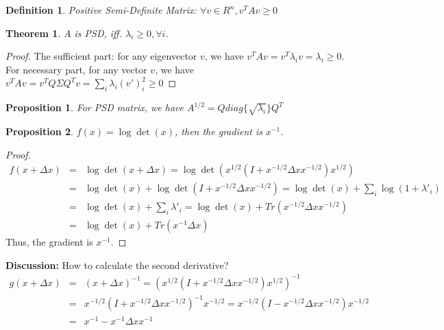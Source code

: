 \documentclass[12pt]{article}
\newtheorem{theorem}{Theorem}[section]
\newtheorem{definition}{Definition}[section]
\newtheorem{proposition}{Proposition}[section]
\begin{document}
\begin{definition}
	Positive Semi-Definite Matrix: $\forall v\in R^n, v^TAv\ge0$
\end{definition}
\begin{theorem}
	$A$ is PSD, iff. $\lambda_i\ge0, \forall i$.
\end{theorem} 
\begin{proof}
	The sufficient part: for any eigenvector $v$, we have $v^TAv=v^T\lambda_i v=\lambda_i\ge0$. For necessary part, for any vector $v$, we have $v^TAv=v^TQ\Sigma Q^Tv=\sum_i \lambda_i(v')_i^2\ge0$
\end{proof}
\begin{proposition}
	For PSD matrix, we have $A^{1/2}=Qdiag\{\sqrt{\lambda_i}\}Q^T$
\end{proposition}
\begin{proposition}
	$f(x) = \log\det(x)$, then the gradient is $x^{-1}$.
\end{proposition}
\begin{proof}
\begin{eqnarray}
f(x+\Delta x) &=& \log \det (x+\Delta x)=\log\det(x^{1/2}(I+x^{-1/2}\Delta xx^{-1/2})x^{1/2})\\
&=&\log \det(x) + \log\det(I+x^{-1/2}\Delta xx^{-1/2})=\log \det(x) +\sum_i \log(1+\lambda'_i)\\
&=&\log \det(x) +\sum_i \lambda'_i = \log \det(x) + Tr(x^{-1/2}\Delta xx^{-1/2}) \\
&=&\log \det(x) + Tr(x^{-1}\Delta x) 
\end{eqnarray}
Thus, the gradient is $x^{-1}$.
\end{proof}
{\bf Discussion: }How to calculate the second derivative? 
\begin{eqnarray}
	g(x+\Delta x)&=&(x+\Delta x)^{-1} = (x^{1/2}(I+x^{-1/2}\Delta x x^{-1/2})x^{1/2})^{-1}\\
	&=&x^{-1/2}(I+x^{-1/2}\Delta x x^{-1/2})^{-1}x^{-1/2}=x^{-1/2}(I-x^{-1/2}\Delta x x^{-1/2})x^{-1/2}\\
	&=&x^{-1} - x^{-1}\Delta x x^{-1}
\end{eqnarray}
\end{document}
